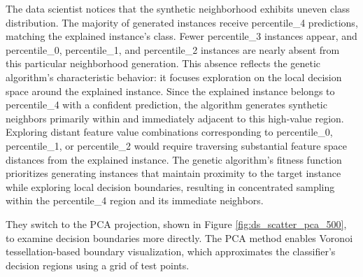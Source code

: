 The data scientist notices that the synthetic neighborhood exhibits uneven class distribution. The majority of generated instances receive percentile\_4 predictions, matching the explained instance's class. Fewer percentile\_3 instances appear, and percentile\_0, percentile\_1, and percentile\_2 instances are nearly absent from this particular neighborhood generation. This absence reflects the genetic algorithm's characteristic behavior: it focuses exploration on the local decision space around the explained instance. Since the explained instance belongs to percentile\_4 with a confident prediction, the algorithm generates synthetic neighbors primarily within and immediately adjacent to this high-value region. Exploring distant feature value combinations corresponding to percentile\_0, percentile\_1, or percentile\_2 would require traversing substantial feature space distances from the explained instance. The genetic algorithm's fitness function prioritizes generating instances that maintain proximity to the target instance while exploring local decision boundaries, resulting in concentrated sampling within the percentile\_4 region and its immediate neighbors.

They switch to the PCA projection, shown in Figure \ref{fig:ds_scatter_pca_500}, to examine decision boundaries more directly. The PCA method enables Voronoi tessellation-based boundary visualization, which approximates the classifier's decision regions using a grid of test points.

